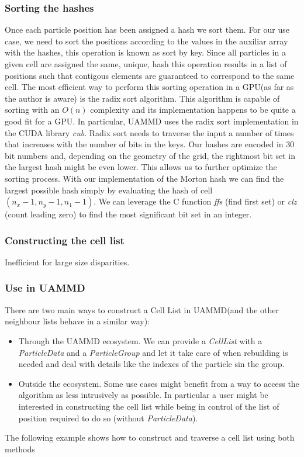 \documentclass[ twoside,openright,titlepage,numbers=noenddot,%
headinclude,footinclude,cleardoublepage=empty,abstract=on,
BCOR=5mm,paper=a4,fontsize=11pt, dvipsnames
]{scrreprt}
\newcommand{\uammd}{\gls{UAMMD}\xspace}
\newcommand{\gpu}{\gls{GPU}\xspace}
\begin{document}
\subsubsection*{Sorting the hashes}
Once each particle position has been assigned a hash we sort them. For our use case, we need to sort the positions according to the values in the auxiliar array with the hashes, this operation is known as sort by key. Since all particles in a given cell are assigned the same, unique, hash this operation results in a list of positions such that contigous elements are guaranteed to correspond to the same cell.
The most efficient way to perform this sorting operation in a \gpu (as far as the author is aware) is the radix sort algorithm\cite{Ha2009}\cite{Singh2018}\cite{Merrill2011}. This algorithm is capable of sorting with an $O(n)$ complexity and its implementation happens to be quite a good fit for a \gpu. In particular, \uammd uses the radix sort implementation in the CUDA library \emph{cub}\cite{cub}. Radix sort needs to traverse the input a number of times that increases with the number of bits in the keys. Our hashes are encoded in $30$ bit numbers and, depending on the geometry of the grid, the rightmost bit set in the largest hash might be even lower. This allows us to further optimize the sorting process. With our implementation of the Morton hash we can find the largest possible hash simply by evaluating the hash of cell $(n_x-1, n_y-1, n_1-1)$. We can leverage the C function \emph{ffs} (find first set) or \emph{clz} (count leading zero) to find the most significant bit set in an integer.


\subsubsection*{Constructing the cell list}


Inefficient for large size disparities.
\subsubsection*{Use in UAMMD}
There are two main ways to construct a Cell List in \uammd (and the other neighbour lists behave in a similar way):
\begin{itemize}
\item Through the \uammd ecosystem.
  We can provide a \emph{CellList} with a \emph{ParticleData} and a \emph{ParticleGroup} and let it take care of when rebuilding is needed and deal with details like the indexes of the particle sin the group.
\item Outside the ecosystem.
  Some use cases might benefit from a way to access the algorithm as less intrusively as possible. In particular a user might be interested in constructing the cell list while being in control of the list of position required to do so (without \emph{ParticleData}).
\end{itemize}
The following example shows how to construct and traverse a cell list using both methods
\end{document}
